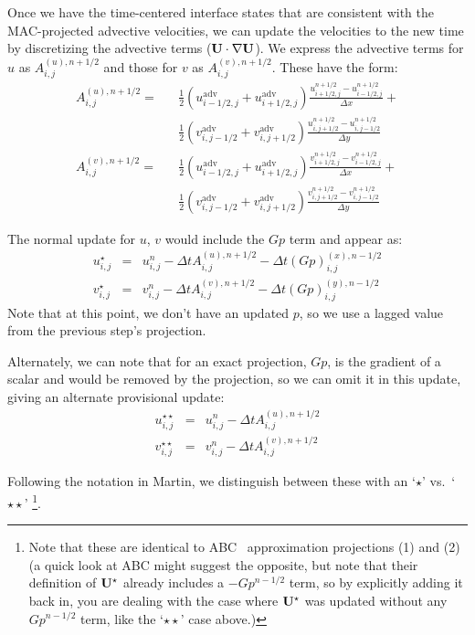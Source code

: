 Once we have the time-centered interface states that are consistent with
the MAC-projected advective velocities, we can update the velocities to
the new time by discretizing the advective terms (${\bf U}\cdot \nabla {\bf U}$).
We express the advective terms for $u$ as $A^{(u),n+1/2}_{i,j}$ and
those for $v$ as $A^{(v),n+1/2}_{i,j}$.  These have the form:
\begin{eqnarray}
A^{(u),n+1/2}_{i,j} =   
   && \frac{1}{2}
     \left ( u^\mathrm{adv}_{i-1/2,j} + u^\mathrm{adv}_{i+1/2,j} \right )
     \frac{u^{n+1/2}_{i+1/2,j} - u^{n+1/2}_{i-1/2,j}}{\Delta x} + \nonumber \\
   && \frac{1}{2}
     \left ( v^\mathrm{adv}_{i,j-1/2} + v^\mathrm{adv}_{i,j+1/2} \right )
     \frac{u^{n+1/2}_{i,j+1/2} - u^{n+1/2}_{i,j-1/2}}{\Delta y} \\
%
A^{(v),n+1/2}_{i,j} = 
   && \frac{1}{2}
     \left ( u^\mathrm{adv}_{i-1/2,j} + u^\mathrm{adv}_{i+1/2,j} \right )
     \frac{v^{n+1/2}_{i+1/2,j} - v^{n+1/2}_{i-1/2,j}}{\Delta x} \nonumber +\\
   && \frac{1}{2}
     \left ( v^\mathrm{adv}_{i,j-1/2} + v^\mathrm{adv}_{i,j+1/2} \right )
     \frac{v^{n+1/2}_{i,j+1/2} - v^{n+1/2}_{i,j-1/2}}{\Delta y}
\end{eqnarray}

The normal update for $u$, $v$ would include the $Gp$ term and appear
as:
\begin{eqnarray}
u^{\star}_{i,j} &=& u^n_{i,j} - \Delta t A^{(u),n+1/2}_{i,j} - \Delta t (G p)^{(x),n-1/2}_{i,j} \\
v^{\star}_{i,j} &=& v^n_{i,j} - \Delta t A^{(v),n+1/2}_{i,j} - \Delta t (G p)^{(y),n-1/2}_{i,j} 
\end{eqnarray}
Note that at this point, we don't have an updated $p$, so we use a lagged
value from the previous step's projection.

Alternately, we can note that for an exact projection, $Gp$, is the gradient
of a scalar and would be removed by the projection, so we can omit it in
this update, giving an alternate provisional update:
\begin{eqnarray}
u^{\star\star}_{i,j} &=& u^n_{i,j} - \Delta t A^{(u),n+1/2}_{i,j}  \\
v^{\star\star}_{i,j} &=& v^n_{i,j} - \Delta t A^{(v),n+1/2}_{i,j}  
\end{eqnarray}


Following the notation in Martin, we distinguish between these with
an `$\star$' vs.\ `$\star\star$' \footnote{Note that these are identical to
ABC~\cite{ABC} approximation projections (1) and (2) (a quick look at ABC might
suggest the opposite, but note that their definition of ${\bf U}^\star$
already includes a $-Gp^{n-1/2}$ term, so by explicitly adding it back
in, you are dealing with the case where ${\bf U}^\star$ was updated without
any $Gp^{n-1/2}$ term, like the `$\star\star$' case above.)}.


